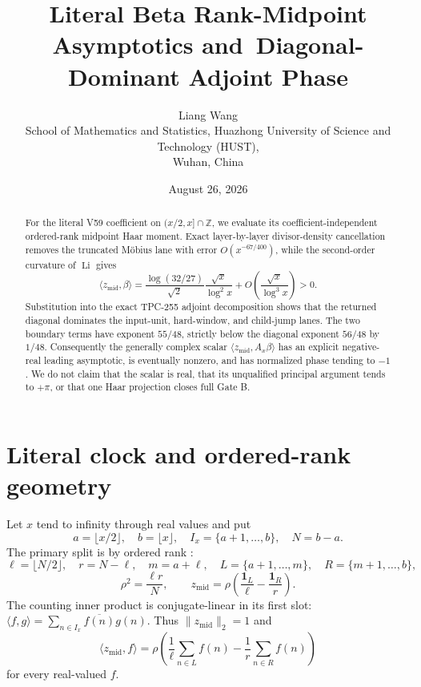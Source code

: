 \documentclass[10pt]{article}
\title{Literal Beta Rank-Midpoint Asymptotics and\
Diagonal-Dominant Adjoint Phase}
\author{Liang Wang\\
\small School of Mathematics and Statistics, Huazhong University of Science and Technology (HUST),\\
\small Wuhan, China}
\date{August 26, 2026}
\newcommand{\one}{\mathbf 1}
\newcommand{\ip}[2]{\langle #1,#2\rangle}
\newcommand{\zm}{z_{\mathrm{mid}}}
\newcommand{\Ax}{A_x}
\newcommand{\Li}{\operatorname{Li}}
\begin{document}
\maketitle

\begin{abstract}
For the literal V59 coefficient on $(x/2,x]\cap\mathbb Z$, we evaluate its
coefficient-independent ordered-rank midpoint Haar moment.  Exact
layer-by-layer divisor-density cancellation removes the truncated M\"obius
lane with error $O(x^{-67/400})$, while the second-order curvature of
$\Li$ gives
\[
 \ip{\zm}{\beta}
 =\frac{\log(32/27)}{\sqrt2}\frac{\sqrt{x}}{\log^2x}
  +O\!\left(\frac{\sqrt{x}}{\log^3x}\right)>0.
\]
Substitution into the exact TPC-255 adjoint decomposition shows that the
returned diagonal dominates the input-unit, hard-window, and child-jump
lanes.  The two boundary terms have exponent $55/48$, strictly below the
diagonal exponent $56/48$ by $1/48$.  Consequently the generally complex
scalar $\ip{\zm}{\Ax\beta}$ has an explicit negative-real leading
asymptotic, is eventually nonzero, and has normalized phase tending to
$-1$.  We do not claim that the scalar is real, that its unqualified
principal argument tends to $+\pi$, or that one Haar projection closes full
Gate B.
\end{abstract}

\section{Literal clock and ordered-rank geometry}

Let $x$ tend to infinity through real values and put
\begin{equation}
 a=\lfloor x/2\rfloor,\quad b=\lfloor x\rfloor,
 \quad I_x=\{a+1,\ldots,b\},\quad N=b-a.             \label{eq:clock}
\end{equation}
The primary split is by ordered rank \cite{tpc253}:
\begin{equation}
 \ell=\lfloor N/2\rfloor,\quad r=N-\ell,\quad m=a+\ell,
 \quad L=\{a+1,\ldots,m\},\quad R=\{m+1,\ldots,b\}, \label{eq:rank}
\end{equation}
\begin{equation}
 \rho^2=\frac{\ell r}{N},\qquad
 \zm=\rho\left(\frac{\one_L}{\ell}-\frac{\one_R}{r}\right). \label{eq:haar}
\end{equation}
The counting inner product is conjugate-linear in its first slot:
$\ip fg=\sum_{n\in I_x}\overline{f(n)}g(n)$.  Thus $\|\zm\|_2=1$ and
\begin{equation}
 \ip{\zm}{f}=\rho\left(\frac1\ell\sum_{n\in L}f(n)
                 -\frac1r\sum_{n\in R}f(n)\right)              \label{eq:contrast}
\end{equation}
for every real-valued $f$.
\end{document}
